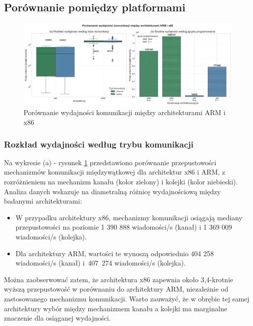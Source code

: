 \subsection{Porównanie pomiędzy platformami}
\begin{figure}[H]
    \centering
    \includegraphics[width=\textwidth]{analiza/images/conc/pc/compare/rysunek_1_porownanie_wydajnosci.png}
    \caption{Porównanie wydajności komunikacji między architekturami ARM i x86}
    \label{rysunek_1_porownanie_wydajnosci}
\end{figure}
\subsubsection{Rozkład wydajności według trybu komunikacji}
Na wykresie (a) - rysunek \ref{rysunek_1_porownanie_wydajnosci} przedstawiono porównanie przepustowości mechanizmów komunikacji międzywątkowej dla architektur x86 i ARM, z rozróżnieniem na mechanizm kanału (kolor zielony) i kolejki (kolor niebieski). Analiza danych wskazuje na diametralną różnicę wydajnościową między badanymi architekturami:
\begin{itemize}
    \item W przypadku architektury x86, mechanizmy komunikacji osiągają mediany przepustowości na poziomie 1 390 888 wiadomości/s (kanał) i 1 369 009 wiadomości/s (kolejka).
    \item Dla architektury ARM, wartości te wynoszą odpowiednio 404 258 wiadomości/s (kanał) i~\mbox{407 274} wiadomości/s (kolejka).
\end{itemize}

Można zaobserwować zatem, że architektura x86 zapewnia około 3,4-krotnie wyższą przepustowość w porównaniu do architektury ARM, niezależnie od zastosowanego mechanizmu komunikacji. Warto zauważyć, że w obrębie tej samej architektury wybór między mechanizmem kanału a kolejki ma marginalne znaczenie dla osiąganej wydajności.

